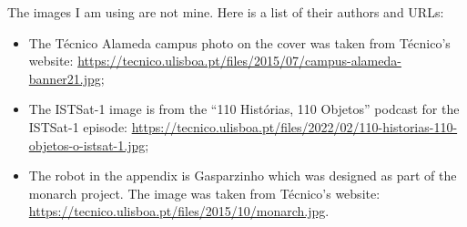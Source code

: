 The images I am using are not mine. Here is a list of their authors and URLs:

\begin{itemize}
    \item The Técnico Alameda campus photo on the cover was taken from Técnico's website: \url{https://tecnico.ulisboa.pt/files/2015/07/campus-alameda-banner21.jpg};
    \item The ISTSat-1 image is from the ``110 Histórias, 110 Objetos'' podcast for the ISTSat-1 episode: \url{https://tecnico.ulisboa.pt/files/2022/02/110-historias-110-objetos-o-istsat-1.jpg};
    \item The robot in the appendix is Gasparzinho which was designed as part of the \acrshort{monarch} project. The image was taken from Técnico's website: \url{https://tecnico.ulisboa.pt/files/2015/10/monarch.jpg}.
\end{itemize}


